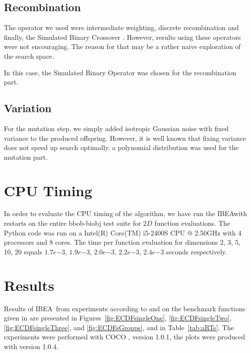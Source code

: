 \documentclass{sig-alternate}
\newcommand{\algname}{IBEA}
\begin{document}
\subsection{Recombination}

The operator we used were intermediate weighting, discrete recombination  and finally, the Simulated Binary Crossover \cite{deb1994simulated}. However, results using these operators were not encouraging. The reason for that may be a rather naive exploration of the search space.

In this case, the Simulated Binary Operator was chosen for the recombination part.
\subsection{Variation}

For the mutation step, we simply added isotropic Gaussian noise with fixed variance to the produced offspring. However, it is well known that fixing variance does not speed up search optimally.
a polynomial distribution was used for the mutation part.  
\section{CPU Timing}
In order to evaluate the CPU timing of the algorithm, we have run the \algname with restarts on the entire bbob-biobj test suite \cite{biobj2016func} for $2 D$ function evaluations. The Python code was run on a Intel(R) Core(TM) i5-2400S CPU @ 2.50GHz with 4 processors and 8 cores. The time per function evaluation for dimensions 2, 3, 5, 10, 20 equals $1.7e{-3}$, $1.9e{-3}$, $2.0e{-3}$, $2.2e{-3}$, $2.4e{-3}$ seconds respectively.  


\section{Results}

Results of \algname\ from experiments according to \cite{hansen2016exp} and \cite{brockhoff2016biobjective} on the benchmark
functions given in \cite{biobj2016func} are presented in
Figures~\ref{fig:ECDFsingleOne}, \ref{fig:ECDFsingleTwo}, \ref{fig:ECDFsingleThree}, and \ref{fig:ECDFsGroups}, and in
Table~\ref{tab:aRTs}. The experiments were performed with COCO \cite{hansen2016cocoplat}, version 1.0.1, the plots were produced with version 1.0.4.
\end{document}
